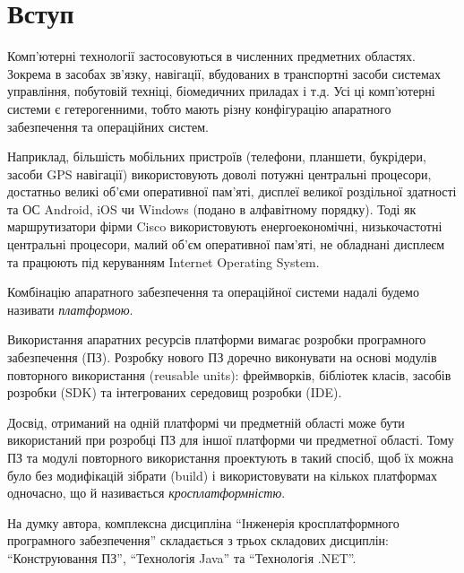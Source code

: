 \section*{Вступ}
Комп'ютерні технології застосовуються в численних предметних областях. Зокрема в засобах зв'язку, навігації, вбудованих в транспортні засоби системах управління, побутовій техніці, біомедичних приладах і т.д. Усі ці комп'ютерні системи є гетерогенними, тобто мають різну конфігурацію апаратного забезпечення та операційних систем. 

Наприклад, більшість мобільних пристроїв (телефони, планшети, букрідери, засоби GPS навігації) використовують доволі потужні центральні процесори, достатньо великі об'єми оперативної пам'яті, дисплеї великої роздільної здатності та ОС Android, iOS чи Windows (подано в алфавітному порядку). Тоді як маршрутизатори фірми Cisco використовують енергоекономічні, низькочастотні центральні процесори, малий об'єм оперативної пам'яті, не обладнані дисплеєм та працюють під керуванням Internet Operating System. 

Комбінацію апаратного забезпечення та операційної системи надалі будемо називати {\it платформою}. 

Використання апаратних ресурсів платформи вимагає розробки програмного забезпечення (ПЗ). Розробку нового ПЗ доречно виконувати на основі модулів повторного використання (reusable units): фреймворків, бібліотек класів, засобів розробки (SDK) та інтегрованих середовищ розробки (IDE).

Досвід, отриманий на одній платформі чи предметній області може бути використаний при розробці ПЗ для іншої платформи чи предметної області. Тому ПЗ та модулі повторного використання проектують в такий спосіб, щоб їх можна було без модифікацій зібрати (build) і використовувати на кількох платформах одночасно, що й називається {\it кросплатформністю}.

На думку автора, комплексна дисципліна ``Інженерія кросплатформного програмного забезпечення'' складається з трьох складових дисциплін: ``Конструювання ПЗ'', ``Технологія Java'' та ``Технологія .NET''.


